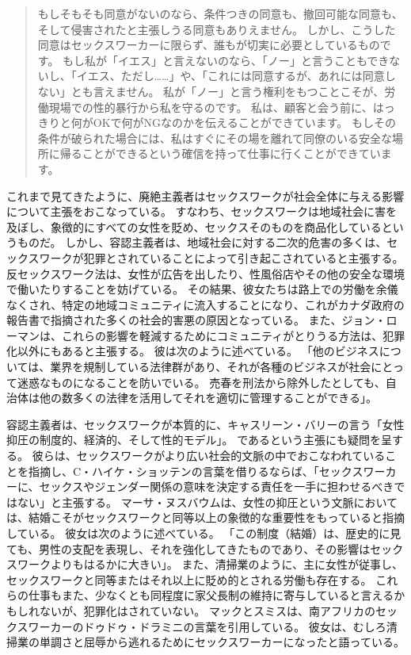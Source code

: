 \documentclass[paper=a4,book,openany]{jlreq}
\newcommand{\ig}[1]{}           %
\begin{document}
\begin{quote}
もしそもそも同意がないのなら、条件つきの同意も、撤回可能な同意も、そして侵害されたと主張しうる同意もありえません。
しかし、こうした同意はセックスワーカーに限らず、誰もが切実に必要としているものです。
もし私が「イエス」と言えないのなら、「ノー」と言うこともできないし、「イエス、ただし……」や、「これには同意するが、あれには同意しない」とも言えません。
私が「ノー」と言う権利をもつことこそが、労働現場での性的暴行から私を守るのです。
私は、顧客と会う前に、はっきりと何がOKで何がNGなのかを伝えることができています。
もしその条件が破られた場合には、私はすぐにその場を離れて同僚のいる安全な場所に帰ることができるという確信を持って仕事に行くことができています。
\citep{slyfox17:_sex_worker_consen}
\end{quote}

これまで見てきたように、廃絶主義者はセックスワークが社会全体に与える影響について主張をおこなっている。
すなわち、セックスワークは地域社会に害を及ぼし、象徴的にすべての女性を貶め、セックスそのものを商品化しているというものだ。
しかし、容認主義者は、地域社会に対する二次的危害の多くは、セックスワークが犯罪とされていることによって引き起こされていると主張する。
反セックスワーク法は、女性が広告を出したり、性風俗店やその他の安全な環境で働いたりすることを妨げている。
その結果、彼女たちは路上での労働を余儀なくされ、特定の地域コミュニティに流入することになり、これがカナダ政府の報告書で指摘された多くの社会的害悪の原因となっている。
また、ジョン・ローマン\ig{John Lowman}は、これらの影響を軽減するためにコミュニティがとりうる方法は、犯罪化以外にもあると主張する。
彼は次のように述べている。
「他のビジネスについては、業界を規制している法律群があり、それが各種のビジネスが社会にとって迷惑なものになることを防いでいる。
売春を刑法から除外したとしても、自治体は他の数多くの法律を活用してそれを適切に管理することができる」\citep{makin09:_pickt_factor}。

容認主義者は、セックスワークが本質的に、キャスリーン・バリー\ig{Barry}の言う「女性抑圧の制度的、経済的、そして性的モデル」\citep[p.24]{barry95:_prost_sexual}。
であるという主張にも疑問を呈する。
彼らは、セックスワークがより広い社会的文脈の中でおこなわれていることを指摘し、C・ハイケ・ショッテンの言葉を借りるならば、「セックスワーカーに、セックスやジェンダー関係の意味を決定する責任を一手に担わせるべきではない」と主張する\citep[p.223]{schotten05:_men_mascul_male_domin}。
マーサ・ヌスバウムは、女性の抑圧という文脈においては、結婚こそがセックスワークと同等以上の象徴的な重要性をもっていると指摘している。
彼女は次のように述べている。
「この制度（結婚）は、歴史的に見ても、男性の支配を表現し、それを強化してきたものであり、その影響はセックスワークよりもはるかに大きい」\citep[p.719]{nussbaum98:_wheth_reason_prejud}。
また、清掃業のように、主に女性が従事し、セックスワークと同等またはそれ以上に貶め的とされる労働も存在する。
これらの仕事もまた、少なくとも同程度に家父長制の維持に寄与していると言えるかもしれないが、犯罪化はされていない。
マックとスミスは、南アフリカのセックスワーカーのドゥドゥ・ドラミニの言葉を引用している。
彼女は、むしろ清掃業の単調さと屈辱から逃れるためにセックスワーカーになったと語っている。
\end{document}
